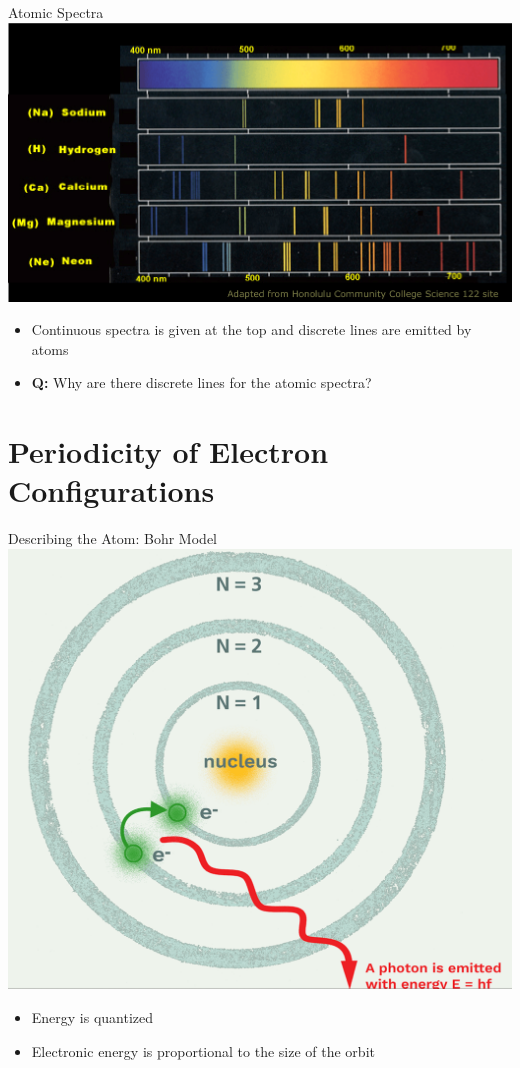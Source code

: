\documentclass[11pt]{beamer}
\begin{document}
\begin{frame}{Atomic Spectra}
  \centering
  \includegraphics[width=0.85\linewidth]{cont_line}
  \begin{itemize}
  \item Continuous spectra is given at the top and
    discrete lines are emitted by atoms
  \item \textbf{Q:} Why are there discrete lines for
    the atomic spectra?
  \end{itemize}
\end{frame}

\section{Periodicity of Electron Configurations}

\begin{frame}{Describing the Atom: Bohr Model}
  \centering
  \includegraphics[width=0.55\linewidth]{bohr_model}
  \begin{itemize}
  \item Energy is quantized
  \item Electronic energy is proportional to the size of
    the orbit
  \end{itemize}
\end{frame}
\end{document}
